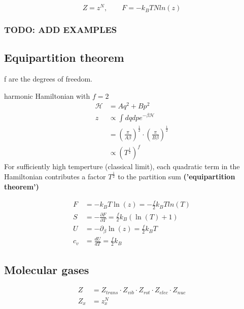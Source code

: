 \begin{equation*}
    Z = z^N , \qquad F = -k_B T N ln(z)
\end{equation*}

\subsubsection*{TODO: ADD EXAMPLES}

\subsection*{Equipartition theorem}
f are the degrees of freedom.

harmonic Hamiltonian with $f=2$
\begin{equation*}
    \begin{aligned}
        \mathcal{H} &= Aq^2 + Bp^2 \\
        z &\propto \int dq dp e^{-\beta \mathcal{H}} \\
        &= \left(\frac{\pi}{A\beta}\right)^{\frac{1}{2}} \cdot \left(\frac{\pi}{B \beta}\right)^{\frac{1}{2}} \\
        &\propto \left(T^{\frac{1}{2}}\right)^f
    \end{aligned}
\end{equation*}
For sufficiently high temperture (classical limit), each quadratic term 
in the Hamiltonian contributes a factor $T^{\frac{1}{2}}$ to the partition sum \textbf{('equipartition theorem')}

\begin{equation*}
    \begin{aligned}
        F &= -k_B T \ln(z) = - \frac{f}{2} k_B T ln(T) \\
        S &= - \frac{\partial F}{\partial T} = \frac{f}{2} k_B (\ln(T)+1) \\
        U &= - \partial_\beta \ln (z) = \frac{f}{2} k_B T \\
        c_v &= \frac{dU}{dT} = \frac{f}{2} k_B
    \end{aligned}
\end{equation*}

\subsection*{Molecular gases}

\begin{equation*}
    \begin{aligned}
        Z &= Z_{trans} \cdot Z_{vib} \cdot Z_{rot} \cdot Z_{elec} \cdot Z_{nuc} \\
        Z_x &= z_x^N
    \end{aligned}
\end{equation*}

